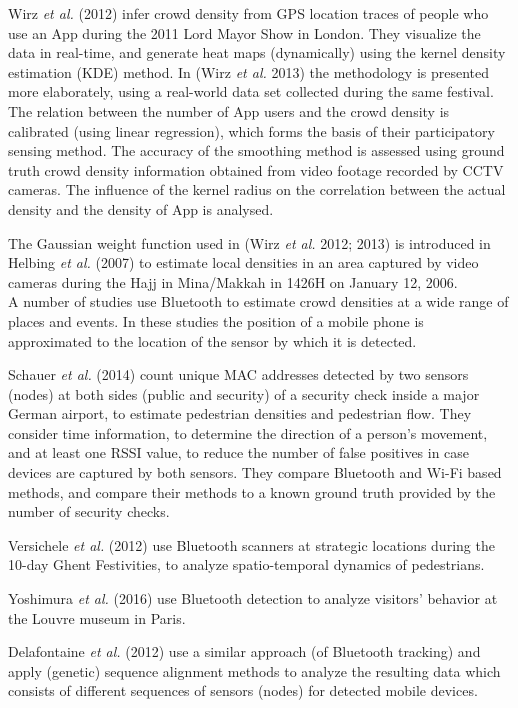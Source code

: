 \documentclass[10pt,a4paper]{article}
\begin{document}
Wirz \textit{et al.} (2012) \cite{wirz:1} infer crowd density from GPS location traces of people who use an App during the 2011 Lord Mayor Show in London. They visualize the data in real-time, and generate heat maps (dynamically) using the kernel density estimation (KDE) method. In (Wirz \textit{et al.} 2013) \cite{wirz:2} the methodology is presented more elaborately, using a real-world data set collected during the same festival. The relation between the number of App users and the crowd density is calibrated (using linear regression), which forms the basis of their participatory sensing method. 
The accuracy of the smoothing method is assessed using ground truth crowd density information obtained from video footage recorded by CCTV cameras. 
The influence of the kernel radius on the correlation between the actual density and the density of App is analysed.

The Gaussian weight function used in (Wirz \textit{et al.} 2012; 2013) \cite{wirz:1}\cite{wirz:2} is introduced in Helbing \textit{et al.} (2007) \cite{helbing:1} to estimate local densities in an area captured by video cameras during the Hajj in Mina/Makkah in 1426H on January 12, 2006.\\

A number of studies use Bluetooth to estimate crowd densities at a wide range of places and events.
In these studies the position of a mobile phone is approximated to the location of the sensor by which it is detected.

Schauer \textit{et al.} (2014) \cite{schauer:1} count unique MAC addresses detected by two sensors (nodes) at both sides (public and security) of a security check inside a major German airport, to estimate pedestrian densities and pedestrian flow. They consider time information, to determine the direction of a person's movement, and at least one RSSI value, to reduce the number of false positives in case devices are captured by both sensors. They compare Bluetooth and Wi-Fi based methods, and compare their methods to a known ground truth provided by the number of security checks.

Versichele \textit{et al.} (2012) \cite{versichele:1} use Bluetooth scanners at strategic locations during the 10-day Ghent Festivities, to analyze spatio-temporal dynamics of pedestrians. 

Yoshimura \textit{et al.} (2016) \cite{yoshimura:1} use Bluetooth detection to analyze visitors' behavior at the Louvre museum in Paris.

Delafontaine \textit{et al.} (2012) \cite{delafontaine:1} use a similar approach (of Bluetooth tracking) and apply (genetic) sequence alignment methods to analyze the resulting data which consists of different sequences of sensors (nodes) for detected mobile devices.
\end{document}
